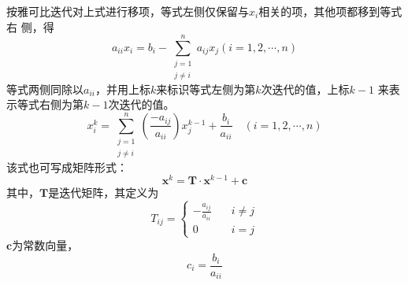 按雅可比迭代对上式进行移项，等式左侧仅保留与$x_{i}$相关的项，其他项都移到等式右
侧，得
\begin{equation}
  a_{ii}x_{i} = b_{i} - 
  \sum_{\substack{j=1\\j\ne i}}^{n}a_{ij}x_{j} (i=1,2,\cdots,n)
\end{equation}
等式两侧同除以$a_{ii}$，并用上标$k$来标识等式左侧为第$k$次迭代的值，上标${k-1}$
来表示等式右侧为第$k-1$次迭代的值。
\begin{equation}
  x_{i}^{k} 
  =
  \sum_{\substack{j=1\\ j\ne i}}^{n}
  \left(
    \frac{-a_{ij}}{a_{ii}}
  \right)
  x_{j}^{k-1}
  +
  \frac{b_{i}}{a_{ii}} 
  \quad
  (i=1,2,\cdots,n)
\end{equation}
该式也可写成矩阵形式：
\begin{equation}
  \mathbf{x}^{k} 
  =
  \mathbf{T}\cdot\mathbf{x}^{k-1} + \mathbf{c}
\end{equation}
其中，$\mathbf{T}$是迭代矩阵，其定义为
\begin{equation}
  T_{ij} 
  =
  \begin{cases}
    \displaystyle
    -\frac{a_{ij}}{a_{ii}} \quad & i\ne j 
    \\
    0 \quad & i=j
  \end{cases}
\end{equation}
$\mathbf{c}$为常数向量，
\begin{equation}
  c_{i} = \frac{b_{i}}{a_{ii}}
\end{equation}

